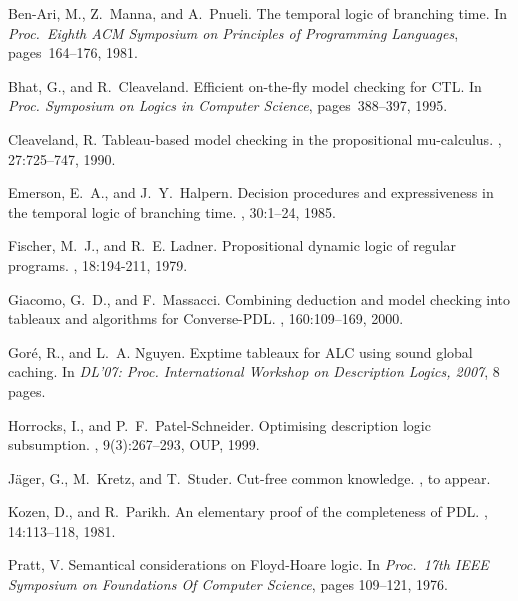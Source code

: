 \documentclass{entcs}
\begin{document}
\begin{center}
\begin{thebibliography}{10}
  Ben-Ari, M., Z.~Manna, and A.~Pnueli.
  \newblock The temporal logic of branching time.
  \newblock In {\em Proc.\ Eighth ACM Symposium on Principles of Programming
    Languages}, pages~164--176, 1981.

  Bhat, G., and R.~Cleaveland.
  \newblock Efficient on-the-fly model checking for {CTL}.
  \newblock In {\em Proc. Symposium on Logics in Computer Science},
  pages~388--397, 1995.

  Cleaveland, R.
  \newblock Tableau-based model checking in the propositional mu-calculus.
  , 27:725--747, 1990.

  Emerson, E.~A., and J.~Y.~Halpern.
  \newblock Decision procedures and expressiveness in the temporal logic of
  branching time.
  , 30:1--24, 1985.

  Fischer, M.~J., and R.~E. Ladner.
  \newblock Propositional dynamic logic of regular programs.
  , 18:194-211, 1979.

  Giacomo, G.~D., and F.~Massacci.
  \newblock Combining deduction and model checking into tableaux and algorithms
  for Converse-PDL.
  , 160:109--169, 2000.

  Gor{\'e}, R., and L.~A. Nguyen.
  \newblock Exptime tableaux for {ALC} using sound global caching.
  \newblock In {\em DL'07: Proc. International Workshop on Description
    Logics, 2007}, 8 pages.

  Horrocks, I., and P.~F.~Patel-Schneider.
  \newblock Optimising description logic subsumption.
  , 9(3):267--293, OUP, 1999.

  J{\"a}ger, G., M.~Kretz, and T.~Studer.
  \newblock Cut-free common knowledge.
  , to appear.

  Kozen, D., and R.~Parikh.
  \newblock An elementary proof of the completeness of {PDL}.
  , 14:113--118, 1981.

  Pratt, V.
  \newblock Semantical considerations on {Floyd-Hoare} logic.
  \newblock In {\em Proc.\ 17th IEEE Symposium on Foundations Of Computer Science}, pages 109--121, 1976.


\end{thebibliography}
\end{center}
\end{document}
